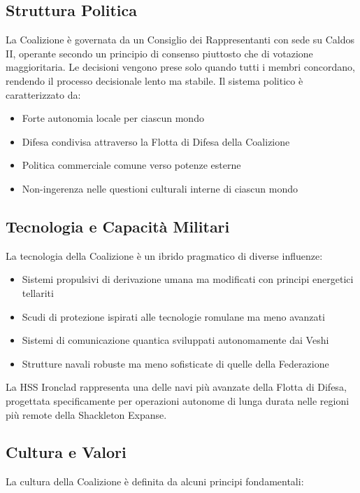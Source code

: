 \documentclass[letterpaper,twocolumn,openany,nodeprecatedcode]{dndbook}
\begin{document}
\subsection{Struttura Politica}
La Coalizione è governata da un Consiglio dei Rappresentanti con sede su Caldos II, operante secondo un principio di consenso piuttosto che di votazione maggioritaria. Le decisioni vengono prese solo quando tutti i membri concordano, rendendo il processo decisionale lento ma stabile.
Il sistema politico è caratterizzato da:

\begin{itemize}
    \item Forte autonomia locale per ciascun mondo
    \item Difesa condivisa attraverso la Flotta di Difesa della Coalizione
    \item Politica commerciale comune verso potenze esterne
    \item Non-ingerenza nelle questioni culturali interne di ciascun mondo
\end{itemize}

\subsection{Tecnologia e Capacità Militari}
La tecnologia della Coalizione è un ibrido pragmatico di diverse influenze:

\begin{itemize}
    \item Sistemi propulsivi di derivazione umana ma modificati con principi energetici tellariti
    \item Scudi di protezione ispirati alle tecnologie romulane ma meno avanzati
    \item Sistemi di comunicazione quantica sviluppati autonomamente dai Veshi
    \item Strutture navali robuste ma meno sofisticate di quelle della Federazione
\end{itemize}

La HSS Ironclad rappresenta una delle navi più avanzate della Flotta di Difesa, progettata specificamente per operazioni autonome di lunga durata nelle regioni più remote della Shackleton Expanse.
\subsection{Cultura e Valori}
La cultura della Coalizione è definita da alcuni principi fondamentali:
\end{document}
